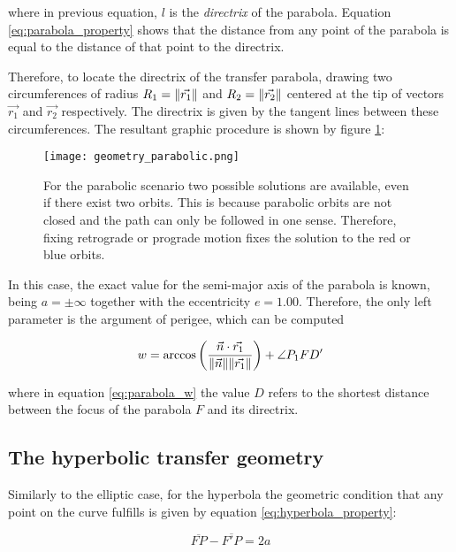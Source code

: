 where in previous equation, $l$ is the \textit{directrix} of the parabola.
Equation \ref{eq:parabola_property} shows that the distance from any point of
the parabola is equal to the distance of that point to the directrix.

Therefore, to locate the directrix of the transfer parabola, drawing two
circumferences of radius $R_{1} = \lVert\vec{r_{1}}\rVert$ and
$R_{2}=\lVert\vec{r_{2}}\rVert$ centered at the tip of vectors $\vec{r_{1}}$ and
$\vec{r_{2}}$ respectively. The directrix is given by the tangent lines between
these circumferences. The resultant graphic procedure is shown by figure
\ref{fig:parabolic_geometry}:

\begin{figure}[H]
  \centering
  \texttt{[image: geometry\_parabolic.png]}
  \caption{ For the parabolic scenario two possible solutions are available,
    even if there exist two orbits. This is because parabolic orbits are
    not closed and the path can only be followed in one sense. Therefore,
    fixing retrograde or prograde motion fixes the solution to the red or
    blue orbits.
  }
  \label{fig:parabolic_geometry}
\end{figure}

In this case, the exact value for the semi-major axis of the parabola is known,
being $a = \pm \infty$ together with the eccentricity $e=1.00$. Therefore, the
only left parameter is the argument of perigee, which can be computed

\begin{equation}
  w = \arccos{\left(\frac{\vec{n} \cdot \vec{r_{1}}}{\lVert\vec{n}\rVert
      \lVert\vec{r_{1}}\rVert} \right) + \angle P_{1}FD'}
  \label{eq:parabola_w}
\end{equation}

where in equation \ref{eq:parabola_w} the value $D$ refers to the shortest
distance between the focus of the parabola $F$ and its directrix.

\subsection{The hyperbolic transfer geometry}

Similarly to the elliptic case, for the hyperbola the geometric condition that
any point on the curve fulfills is given by equation
\ref{eq:hyperbola_property}:

\begin{equation}
  \overline{FP} - \overline{F'P} = 2a
  \label{eq:hyperbola_property}
\end{equation}


